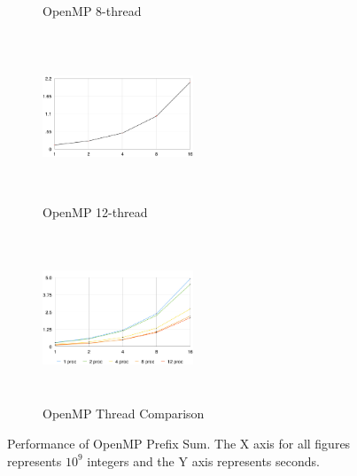 \documentclass[11pt]{article}
\begin{document}
\begin{figure}[t]
\begin{subfigure}[h!]{0.3\textwidth}
        \caption{OpenMP 8-thread}
    \end{subfigure}
    \hfill
    \begin{subfigure}[h!]{0.3\textwidth}
        \centering
        \includegraphics[width=4.5cm,height=5cm,keepaspectratio]{o12}
        \caption{OpenMP 12-thread}
    \end{subfigure}
    \hfill
    \begin{subfigure}[h!]{0.3\textwidth}
        \centering
        \includegraphics[width=4.5cm,height=5cm,keepaspectratio]{OpenMP_Comp}
        \caption{OpenMP Thread Comparison}
    \end{subfigure}
    \hfill
    \caption{Performance of OpenMP Prefix Sum. The X axis for all figures represents $10^{9}$ integers and the Y axis represents seconds.}
\end{figure}
\end{document}
